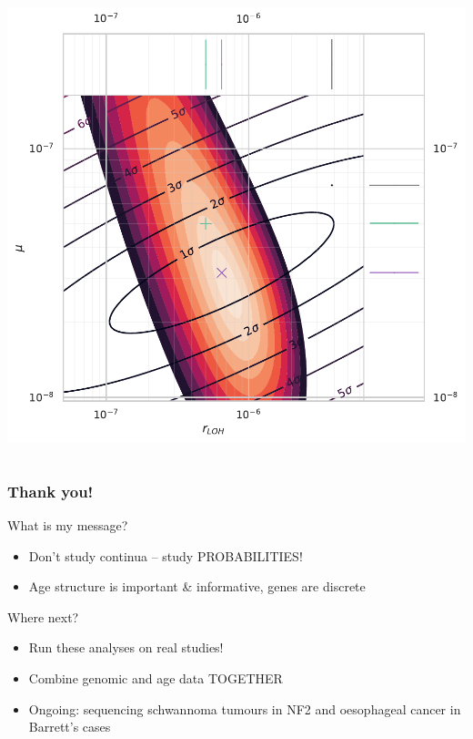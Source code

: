 \documentclass{beamer}
\begin{document}
\begin{frame}
\begin{columns}
\begin{column}{0.5\textwidth}
        \includegraphics[width=\textwidth]{figures/scatterplot_floating_mutrates_fixed_100}
        \end{column}
    \end{columns}
\end{frame}


\begin{frame}
    \frametitle{Thank you!}
    What is my message?
    \begin{itemize}
        \item Don't study continua -- study PROBABILITIES!
        \item Age structure is important \& informative, genes are discrete
    \end{itemize}

    Where next?
    \begin{itemize}
        \item Run these analyses on real studies!
        \item Combine genomic and age data TOGETHER
        \item Ongoing: sequencing schwannoma tumours in NF2 and oesophageal
        cancer in Barrett's cases
    \end{itemize}
\end{frame}
\end{document}
